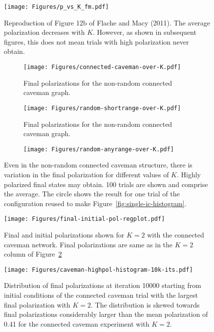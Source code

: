 \begin{figure}
  \centering
    \texttt{[image: Figures/p\_vs\_K\_fm.pdf]}
  \caption{Reproduction of Figure 12b of Flache and Macy (2011). The average
    polarization decreases with $K$. However, as shown in subsequent figures,
    this does not mean trials with high polarization never obtain.
  }
  \label{fig:p_vs_K_fm}
\end{figure}


\begin{figure}[h!]
  \centering
    \begin{subfigure}[t]{\textwidth}
      \centering
      \texttt{[image: Figures/connected-caveman-over-K.pdf]}
      \caption{Final polarizations for the non-random connected caveman graph.}
      \label{fig:connected-caveman-trials}
    \end{subfigure}
    \begin{subfigure}[t]{\textwidth}
      \centering
      \texttt{[image: Figures/random-shortrange-over-K.pdf]}
      \caption{Final polarizations for the non-random connected caveman graph.}
      \label{fig:random-shortrange-trials}
    \end{subfigure}
    \begin{subfigure}[t]{\textwidth}
      \centering
      \texttt{[image: Figures/random-anyrange-over-K.pdf]}
      \caption{}
      \label{fig:random-anyrange-trials}
    \end{subfigure}
  \caption{Even in the non-random connected caveman structure, there is 
    variation in the final polarization for different values of $K$. Highly
    polarized final states may obtain. 100 trials are shown and comprise the
    average. The circle shows the result for one trial of the configuration
    reused to make Figure~\ref{fig:single-ic-histogram}.
  }
  \label{fig:single-experiments-over-k}
\end{figure}


\begin{figure}[h!]
  \centering
    \texttt{[image: Figures/final-initial-pol-regplot.pdf]}
  \caption{Final and initial polarizations shown for $K=2$ with the connected 
    caveman network. Final polarizations are same as in the $K=2$ column of 
    Figure~\ref{fig:connected-caveman-trials}}
  \label{fig:final-initial-pol-regplot}
\end{figure}

\begin{figure}[h!]
  \centering
    \texttt{[image: Figures/caveman-highpol-histogram-10k-its.pdf]}
  \caption{Distribution of final polarizations at iteration 10000
  starting from initial conditions
  of the connected caveman trial with the largest final polarization with $K=2$.
  The distribution is skewed towards final polarizations considerably larger
  than the mean polarization of 0.41 for the connected caveman experiment
  with $K=2$. 
  }
  \label{fig:highpol-histogram}
\end{figure}

